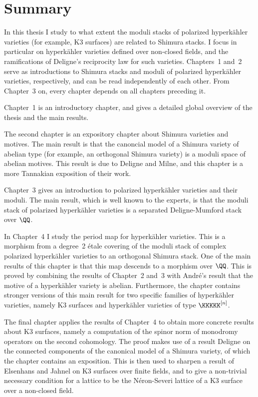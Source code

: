 \chapter*{Summary}
In this thesis I study to what extent the moduli stacks of polarized hyperk\"ahler varieties (for example, K3 surfaces) are related to Shimura stacks. I focus in particular on hyperk\"ahler varieties defined over non-closed fields, and the ramifications of Deligne's reciprocity law for such varieties. Chapters~1 and~2 serve as introductions to Shimura stacks and moduli of polarized hyperk\"ahler varieties, respectively, and can be read independently of each other. From Chapter~3 on, every chapter depends on all chapters preceding it.

Chapter~1 is an introductory chapter, and gives a detailed global overview of the thesis and the main results.

The second chapter is an expository chapter about Shimura varieties and motives. The main result is that the canoncial model of a Shimura variety of abelian type (for example, an orthogonal Shimura variety) is a moduli space of abelian motives. This result is due to Deligne and Milne, and this chapter is a more Tannakian exposition of their work.

Chapter~3 gives an introduction to polarized hyperk\"ahler varieties and their moduli. The main result, which is well known to the experts, is that the moduli stack of polarized hyperk\"ahler varieties is a separated Deligne-Mumford stack over $\QQ$.

In Chapter~4 I study the period map for hyperk\"ahler varieties. This is a morphism from a degree~2 \'etale covering of the moduli stack of complex polarized hyperk\"ahler varieties to an orthogonal Shimura stack. One of the main results of this chapter is that this map descends to a morphism over $\QQ$. This is proved by combining the results of Chapter~2 and~3 with Andr\'e's result that the motive of a hyperk\"ahler variety is abelian. Furthermore, the chapter contains stronger versions of this main result for two specific families of hyperk\"ahler varieties, namely K3 surfaces and hyperk\"ahler varieties of type $\KKKKK^{[n]}$.

The final chapter applies the results of Chapter~4 to obtain more concrete results about K3 surfaces, namely a computation of the spinor norm of monodromy operators on the second cohomology. The proof makes use of a result Deligne on the connected components of the canonical model of a Shimura variety, of which the chapter contains an exposition. This is then used to sharpen a result of Elsenhans and Jahnel on K3 surfaces over finite fields, and to give a non-trivial necessary condition for a lattice to be the N\'eron-Severi lattice of a K3 surface over a non-closed field.
